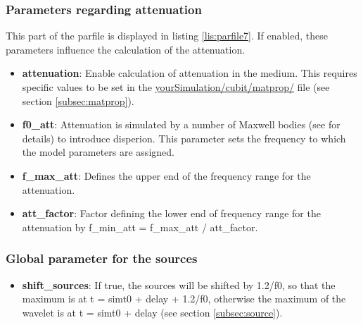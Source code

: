    	\subsubsection{Parameters regarding attenuation}
			This part of the parfile is displayed in listing \ref{lis:parfile7}. If enabled, these parameters influence the calculation of the attenuation.
			
    \begin{itemize}
    	\item \textbf{attenuation}: Enable calculation of attenuation in the medium. This requires specific values to be set in the \url{yourSimulation/cubit/matprop/} file (see section \ref{subsec:matprop}).
    	\item \textbf{f0\_att}: Attenuation is simulated by a number of Maxwell bodies (see \cite{Lambrecht.2015} for details) to introduce disperion. This parameter sets the frequency to which the model parameters are assigned.
		\item \textbf{f\_max\_att}: Defines the upper end of the frequency range for the attenuation.
		\item \textbf{att\_factor}: Factor defining the lower end of frequency range for the attenuation by f\_min\_att = f\_max\_att / att\_factor.
    \end{itemize}

		\subsubsection{Global parameter for the sources}
			
    	\begin{itemize}
    	 \item \textbf{shift\_sources}: If true, the sources will be shifted by 1.2/f0, so that the maximum is at t = simt0 + delay + 1.2/f0, otherwise the maximum of the wavelet is at t = simt0 + delay (see section \ref{subsec:source}).
    	\end{itemize}
    
